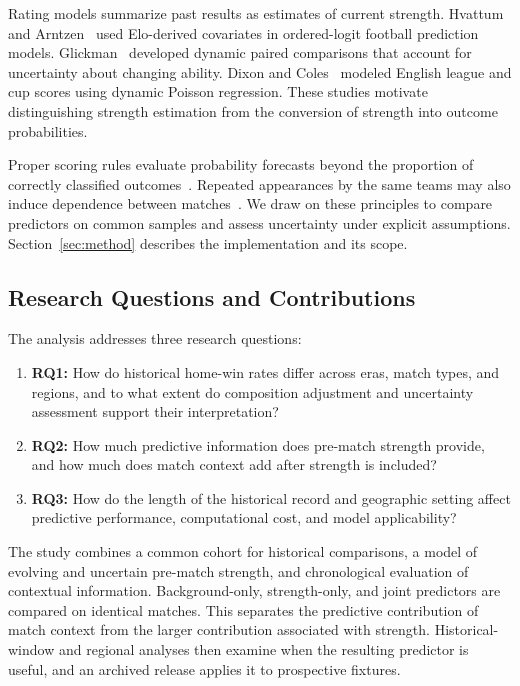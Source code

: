 Rating models summarize past results as estimates of current strength. Hvattum and Arntzen~\citep{hvattum2010elo} used Elo-derived covariates in ordered-logit football prediction models. Glickman~\citep{glickman1999dynamic} developed dynamic paired comparisons that account for uncertainty about changing ability. Dixon and Coles~\citep{dixon1997scores} modeled English league and cup scores using dynamic Poisson regression. These studies motivate distinguishing strength estimation from the conversion of strength into outcome probabilities.

Proper scoring rules evaluate probability forecasts beyond the proportion of correctly classified outcomes~\citep{gneiting2007scoring}. Repeated appearances by the same teams may also induce dependence between matches~\citep{aronow2015dyadic}. We draw on these principles to compare predictors on common samples and assess uncertainty under explicit assumptions. Section~\ref{sec:method} describes the implementation and its scope.

\subsection{Research Questions and Contributions}

The analysis addresses three research questions:
\begin{enumerate}
\item \textbf{RQ1:} How do historical home-win rates differ across eras, match types, and regions, and to what extent do composition adjustment and uncertainty assessment support their interpretation?
\item \textbf{RQ2:} How much predictive information does pre-match strength provide, and how much does match context add after strength is included?
\item \textbf{RQ3:} How do the length of the historical record and geographic setting affect predictive performance, computational cost, and model applicability?
\end{enumerate}

The study combines a common cohort for historical comparisons, a model of evolving and uncertain pre-match strength, and chronological evaluation of contextual information. Background-only, strength-only, and joint predictors are compared on identical matches. This separates the predictive contribution of match context from the larger contribution associated with strength. Historical-window and regional analyses then examine when the resulting predictor is useful, and an archived release applies it to prospective fixtures.

